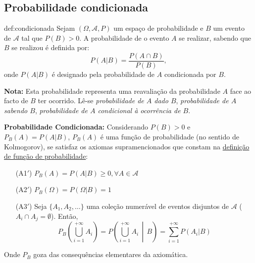 \newcommand{\indep}{\rotatebox[origin=c]{90}{$\,\models\,$}}
\def\equalfootnote{\mathrel{\ensurestackMath{\stackon[1pt]{=}{\raisebox{-1em}{\footnotemark[4]}}}}}
\clearpage
\subsection[1.2 Probabilidade condicionada]{\hspace*{0.075 em}\raisebox{0.2 em}{$\pmb{\drsh}$} Probabilidade condicionada}
\label{subsec:conditional-probability}

\begin{theo}{def:condicionada}\label{def:Prob-condicionada}
    Sejam $(\Omega,\mathcal{A},P)$ um espaço de probabilidade e $B$ um evento de $\mathcal{A}$ tal que $P(B) > 0$. A probabilidade de o evento $A$ se realizar, sabendo que $B$ se realizou é definida por:
    $$
        P(A|B) = \dfrac{P(A \cap B)}{P(B)},
    $$
    onde $P(A|B)$ é designado pela probabilidade de $A$ condicionada por $B$.
    
    \vspace{1 em}
    \noindent \textbf{Nota:} Esta probabilidade representa uma reavaliação da probabilidade $A$ face ao facto de $B$ ter ocorrido. Lê-se \textit{probabilidade de $A$ dado $B$}, \textit{probabilidade de $A$ sabendo $B$}, \textit{probabilidade de $A$ condicional à ocorrência de $B$}. 
\end{theo}

\noindent \textbf{Probabilidade Condicionada:} Considerando $P(B) > 0$ e $P_B(A) = P(A|B)$, $P_B(A)$ é uma função de probabilidade (no sentido de Kolmogorov), se satisfaz os axiomas supramencionados que constam na \hyperref[def:probability-function]{ definição de função de probabilidade}:

\vspace{-0.75 em}
\begin{enumerate}
    \item[(A1$'$)] $P_B(A) = P(A | B) \geq 0, \forall A \in \mathcal{A}$
    \item[(A2$'$)] $P_B(\Omega) = P(\Omega | B) = 1$
    \item[(A3$'$)] Seja $\{A_1, A_2, \dots\}$ uma coleção numerável de eventos disjuntos de $\mathcal{A}$ ($A_i \cap A_j = \emptyset$). Então,
        $$
            P_B\left( \bigcup_{i=1}^{+\infty} A_i \right) =  P\left( \bigcup_{i=1}^{+\infty} A_i \,\middle\vert\, B\right) = \sum_{i=1}^{+\infty} P(A_i | B)  
        $$
\end{enumerate}
Onde $P_B$ goza das consequências elementares da axiomática.

